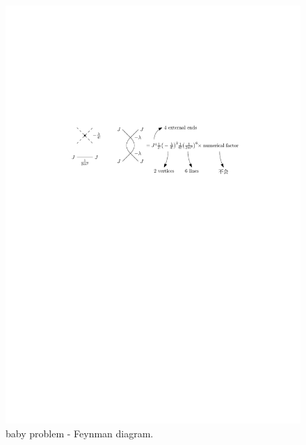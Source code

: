 \begin{itemize}
	\begin{figure}[H]
		\centering
		\includegraphics[scale=1]{figures/a baby problem - Feynman diagram.pdf}
		\caption{baby problem - Feynman diagram.}
	\end{figure}
	

\end{itemize}
